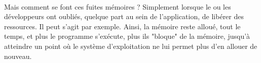 {  \paragraph{} Mais comment se font ces fuites mémoires ? Simplement lorsque le ou les développeurs
  ont oubliés, quelque part au sein de l'application, de libérer des ressources. Il peut s'agit par
  exemple. Ainsi, la mémoire reste alloué, tout le temps, et plus le programme s'exécute, plus ils
  "bloque" de la mémoire, jusqu'à atteindre un point où le système d'exploitation ne lui permet plus
  d'en allouer de nouveau.

}





